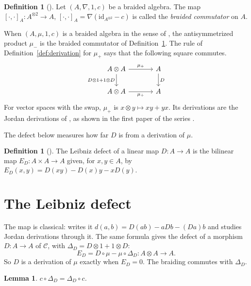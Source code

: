 \documentclass[]{interact}
\theoremstyle{plain}
\newtheorem{lemma}[theorem]{Lemma}
\theoremstyle{definition}
\newtheorem{definition}[theorem]{Definition}
\theoremstyle{remark}
\begin{document}
\begin{definition}[{\citep[Definition 1.5]{Ion2010}}]\label{def:ion}
Let $(A, \nabla, 1, c)$ be a braided algebra. The map $[\cdot,\cdot]_A \colon A^{\otimes 2} \to A$, $[\cdot,\cdot]_A = \nabla(\mathrm{id}_{A^{\otimes 2}} - c)$ is called the \emph{braided commutator} on $A$.
\end{definition}

When $(A, \mu, 1, c)$ is a braided algebra in the sense of \citet[Definition 1.4]{Ion2010}, the antisymmetrized product $\mu_-$ is the braided commutator of Definition~\ref{def:ion}.
The rule of Definition~\ref{def:derivation} for $\mu_+$ says that the following square commutes.
\[
\begin{tikzcd}[column sep=large]
A \otimes A \arrow[r, "\mu_+"] \arrow[d, "D \otimes 1 + 1 \otimes D"'] & A \arrow[d, "D"] \\
A \otimes A \arrow[r, "\mu_+"'] & A
\end{tikzcd}
\]
For vector spaces with the swap, $\mu_+$ is $x \otimes y \mapsto xy + yx$.
Its derivations are the Jordan derivations of \citet[p.~1104]{Herstein1957}, as shown in the first paper of the series \citep[Remark 2.4]{Adrabi2026a}.

The defect below measures how far $D$ is from a derivation of $\mu$. %

\begin{definition}[{\citep[Definition 3.1]{Adrabi2026a}}]\label{def:defect-recalled}
The Leibniz defect of a linear map $D \colon A \to A$ is the bilinear map $E_D \colon A \times A \to A$ given, for $x, y \in A$, by $E_D(x,y) = D(xy) - D(x)y - xD(y)$.
\end{definition}

\section{The Leibniz defect}\label{sec:defect}
The map is classical: \citet[Section 2]{Cusack1975} writes it $d(a,b) = D(ab) - aDb - (Da)b$ and studies Jordan derivations through it.
The same formula gives the defect of a morphism $D \colon A \to A$ of $\mathcal{C}$, with $\Delta_D = D \otimes 1 + 1 \otimes D$:
\[
E_D = D \circ \mu - \mu \circ \Delta_D \colon A \otimes A \to A.
\]
So $D$ is a derivation of $\mu$ exactly when $E_D = 0$.
The braiding commutes with $\Delta_D$. %

\begin{lemma}\label{lem:natural}
$c \circ \Delta_D = \Delta_D \circ c$.
\end{lemma}
\end{document}
